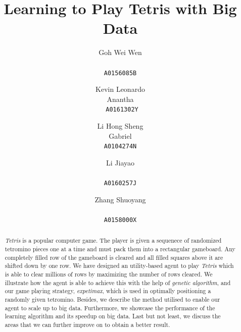 \documentclass{article} %
\author{
  Goh Wei Wen\\ \\
  \texttt{A0156085B}
  \and
  Kevin Leonardo \\Anantha\\
  \texttt{A0161302Y}
 \and
  Li Hong Sheng \\Gabriel\\
  \texttt{A0104274N}
  \and
  Li Jiayao\\ \\
  \texttt{A0160257J}
  \and
  Zhang Shuoyang\\ \\
  \texttt{A0158000X}
}
\title{Learning to Play Tetris with Big Data}
\begin{document}
\maketitle
% 
% 
\begin{abstract}
\noindent
\textsl{Tetris} is a popular computer game. The player is given a sequenece of randomized tetromino pieces one at a time and must pack them into a rectangular gameboard. Any completely filled row of the gameboard is cleared and all filled squares above it are shifted down by one row. We have designed an utility-based agent to play \textsl{Tetris} which is able to clear millions of rows by maximizing the number of rows cleared. We illustrate how the agent is able to achieve this with the help of \textsl{genetic algorithm}, and our game playing strategy, \textsl{expetimax},  which is used in optimally positioning a randomly given tetromino. Besides, we describe the method utilised to enable our agent to scale up to big data. Furthermore, we showcase the performance of the learning algorithm and its speedup on big data. Last but not least, we discuss the areas that we can further improve on to obtain a better result. 



\end{abstract}
\end{document}
